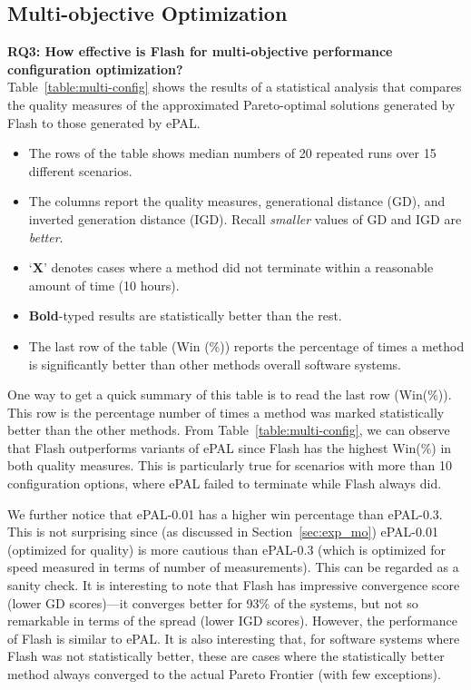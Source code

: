 \documentclass[10pt,journal,compsoc]{IEEEtran}
\newcommand{\flash}{{\sc Flash}\xspace}
\begin{document}
\subsection{Multi-objective Optimization}\label{sec:mo_results}

\noindent\textbf{RQ3: How effective is \flash for multi-objective performance configuration optimization?} \\
Table~\ref{table:multi-config} shows the results of a statistical analysis that compares the quality measures of the approximated Pareto-optimal solutions generated by \flash to those generated by ePAL.
\begin{itemize}[leftmargin=*]
    \item The rows of the table shows median numbers of 20 repeated runs over 15 different scenarios.
    \item The columns report the quality measures, generational distance (GD), and inverted generation distance (IGD). Recall \textit{smaller} values of GD and IGD are \textit{better}.
    \item `\textbf{X}' denotes cases where a method did not terminate within a reasonable amount of time (10 hours).
    \item \textbf{Bold}-typed results are statistically better than the rest.
    \item The last row of the table (Win (\%)) reports the percentage of times a method is significantly better than other methods overall software systems.
\end{itemize}

One way to get a quick summary of this table is to read the last row (Win(\%)). This row is the percentage number of times a method was marked statistically better than the other methods. From Table~\ref{table:multi-config}, we can observe that \flash outperforms variants of ePAL since \flash has the highest Win(\%) in both quality measures. This is particularly true for scenarios with more than 10 configuration options, where ePAL failed to terminate while \flash always did. 

We further notice that ePAL-0.01 has a higher win percentage than ePAL-0.3. This is not surprising since (as discussed in Section~\ref{sec:exp_mo}) ePAL-0.01 (optimized for quality) is more cautious than ePAL-0.3 (which is optimized for speed measured in terms of number of measurements). This can be regarded as a sanity check.  It is interesting to note that \flash has impressive convergence score (lower GD scores)---it converges better for 93\% of the systems, but not so remarkable in terms of the spread (lower IGD scores). However, the performance of \flash is similar to ePAL.
It is also interesting that, for software systems where \flash was not statistically better, these are cases where the statistically better method always converged to the actual Pareto Frontier (with few exceptions). 
\end{document}

